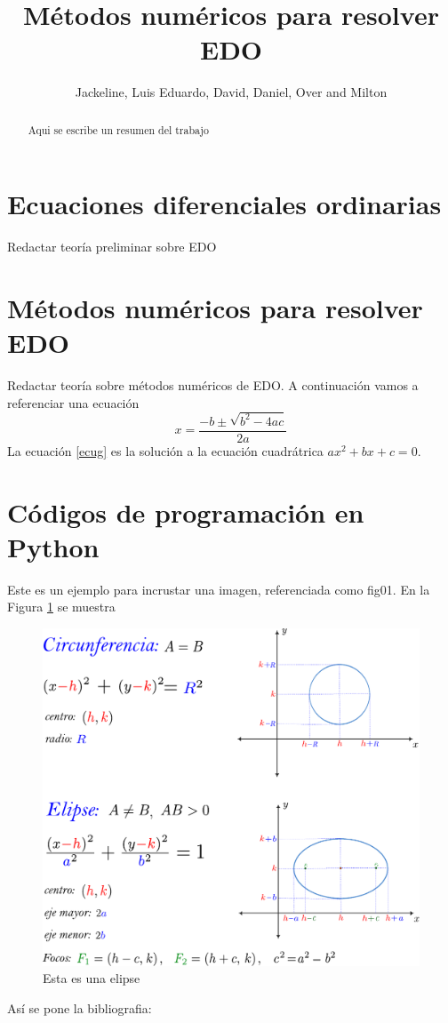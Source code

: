 \documentclass[12pt,letterpaper]{article}
\title{Métodos numéricos para resolver EDO}
\author{Jackeline, Luis Eduardo, David, Daniel, Over and Milton}
\date{}
\begin{document}
\maketitle
\begin{abstract}
 Aqui se escribe un resumen del trabajo  
\end{abstract}

\section{Ecuaciones diferenciales ordinarias}
Redactar teoría preliminar sobre EDO \cite[pp. 43]{librozill}

\section{Métodos numéricos para resolver EDO}
Redactar teoría sobre métodos numéricos de EDO.  A continuación vamos a referenciar una ecuación
\begin{equation}\label{ecug}
    x=\frac{-b\pm\sqrt{b^2-4ac}}{2a}
\end{equation}
La ecuación \eqref{ecug} es la solución a la ecuación cuadrátrica $ax^2+bx+c=0$.

\section{Códigos de programación en Python}
Este es un ejemplo para incrustar una imagen, referenciada como fig01. En la Figura \ref{fig01} se muestra
\begin{figure}[H]
    \centering
    \includegraphics[scale=0.5]{images/elipse.pdf}
    \caption{Esta es una elipse}
    \label{fig01}
\end{figure}

Así se pone la bibliografia:


\end{document}
